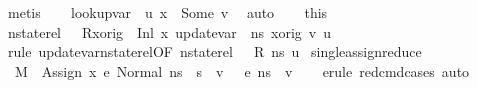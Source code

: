 \begin{isabellebody}
\ metis\isanewline
\ \ \isamarkupfalse%
\ {\isachardoublequoteopen}lookup{\isacharunderscore}{\kern0pt}var\ {\isasymLambda}{\isacharprime}{\kern0pt}\ u{\isacharprime}{\kern0pt}\ x\ {\isacharequal}{\kern0pt}\ Some\ v{\isachardoublequoteclose}\ \isamarkupfalse%
\ auto\isanewline
\ \ \isamarkupfalse%
\ this\ \isamarkupfalse%
\ {\isachardoublequoteopen}nstate{\isacharunderscore}{\kern0pt}rel\ {\isasymLambda}\ {\isasymLambda}{\isacharprime}{\kern0pt}\ {\isacharparenleft}{\kern0pt}R{\isacharparenleft}{\kern0pt}x{\isacharunderscore}{\kern0pt}orig\ {\isasymmapsto}\ {\isacharparenleft}{\kern0pt}Inl\ x{\isacharparenright}{\kern0pt}{\isacharparenright}{\kern0pt}{\isacharparenright}{\kern0pt}\ {\isacharparenleft}{\kern0pt}update{\isacharunderscore}{\kern0pt}var\ {\isasymLambda}\ ns\ x{\isacharunderscore}{\kern0pt}orig\ v{\isacharparenright}{\kern0pt}\ u{\isacharprime}{\kern0pt}{\isachardoublequoteclose}\ \isanewline
\ \ \ \ \isamarkupfalse%
\ {\isacharparenleft}{\kern0pt}rule\ update{\isacharunderscore}{\kern0pt}var{\isacharunderscore}{\kern0pt}nstate{\isacharunderscore}{\kern0pt}rel{\isacharbrackleft}{\kern0pt}OF\ {\isacartoucheopen}nstate{\isacharunderscore}{\kern0pt}rel\ {\isasymLambda}\ {\isasymLambda}{\isacharprime}{\kern0pt}\ R\ ns\ u{\isacharprime}{\kern0pt}{\isacartoucheclose}{\isacharbrackright}{\kern0pt}{\isacharparenright}{\kern0pt}\isanewline
{}\isamarkupfalse%
%
\endisatagproof
{\isafoldproof}%
%
\isadelimproof
\isanewline
%
\endisadelimproof
\isanewline
{}\isamarkupfalse%
\ single{\isacharunderscore}{\kern0pt}assign{\isacharunderscore}{\kern0pt}reduce{\isacharcolon}{\kern0pt}\isanewline
\ \ {\isachardoublequoteopen}M{\isacharcomma}{\kern0pt}{\isasymLambda}{\isacharcomma}{\kern0pt}{\isasymGamma}{\isacharcomma}{\kern0pt}{\isasymOmega}\ {\isasymturnstile}\ {\isasymlangle}Assign\ x\ e{\isacharcomma}{\kern0pt}\ Normal\ n{\isacharunderscore}{\kern0pt}s{\isasymrangle}\ {\isasymrightarrow}\ s{\isacharprime}{\kern0pt}\ {\isasymLongrightarrow}\ {\isasymexists}v{\isachardot}{\kern0pt}\ {\isasymLambda}{\isacharcomma}{\kern0pt}{\isasymGamma}{\isacharcomma}{\kern0pt}{\isasymOmega}\ {\isasymturnstile}\ {\isasymlangle}e{\isacharcomma}{\kern0pt}\ n{\isacharunderscore}{\kern0pt}s{\isasymrangle}\ {\isasymDown}\ v{\isachardoublequoteclose}\isanewline
%
\isadelimproof
\ \ %
\endisadelimproof
%
\isatagproof
{}\isamarkupfalse%
\ {\isacharparenleft}{\kern0pt}erule\ red{\isacharunderscore}{\kern0pt}cmd{\isachardot}{\kern0pt}cases{\isacharsemicolon}{\kern0pt}\ auto{\isacharparenright}{\kern0pt}%

\end{isabellebody}
